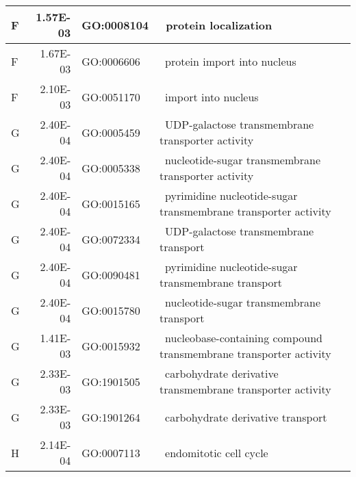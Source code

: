 \begin{longtable}{|l|r|l|l|}
\hline
F                & 1.57E-03                                       & GO:0008104       & ~protein localization                                                 \\
\hline
F                & 1.67E-03                                       & GO:0006606       & ~protein import into nucleus                                          \\
\hline
F                & 2.10E-03                                       & GO:0051170       & ~import into nucleus                                                  \\
\hline
G                & 2.40E-04                                       & GO:0005459       & ~UDP-galactose transmembrane transporter activity                     \\
\hline
G                & 2.40E-04                                       & GO:0005338       & ~nucleotide-sugar transmembrane transporter activity                  \\
\hline
G                & 2.40E-04                                       & GO:0015165       & ~pyrimidine nucleotide-sugar transmembrane transporter activity       \\
\hline
G                & 2.40E-04                                       & GO:0072334       & ~UDP-galactose transmembrane transport                                \\
\hline
G                & 2.40E-04                                       & GO:0090481       & ~pyrimidine nucleotide-sugar transmembrane transport                  \\
\hline
G                & 2.40E-04                                       & GO:0015780       & ~nucleotide-sugar transmembrane transport                             \\
\hline
G                & 1.41E-03                                       & GO:0015932       & ~nucleobase-containing compound transmembrane transporter activity    \\
\hline
G                & 2.33E-03                                       & GO:1901505       & ~carbohydrate derivative transmembrane transporter activity           \\
\hline
G                & 2.33E-03                                       & GO:1901264       & ~carbohydrate derivative transport                                    \\
\hline
H                & 2.14E-04                                       & GO:0007113       & ~endomitotic cell cycle                                               \\

\end{longtable}
